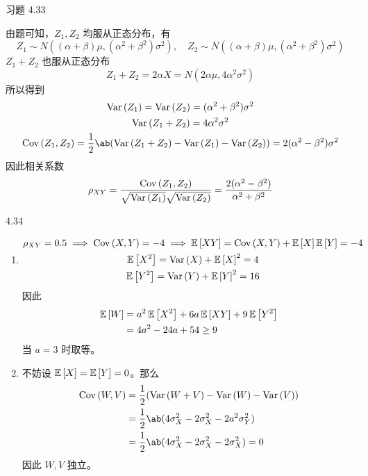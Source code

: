 \begin{problem}
    习题 4.33
    \begin{solution}
        由题可知，$Z_1, Z_2$ 均服从正态分布，有
        $$
        Z_1 \sim N((\alpha + \beta) \mu, (\alpha^2 + \beta^2) \sigma^2),\quad Z_2 \sim N((\alpha + \beta) \mu, (\alpha^2 + \beta^2) \sigma^2)
        $$
        $Z_1 + Z_2$ 也服从正态分布
        $$
        Z_1 + Z_2 = 2 \alpha X = N(2 \alpha \mu, 4 \alpha^2 \sigma^2)
        $$
        所以得到
        $$
        \begin{gathered}
            \variance{Z_1} = \variance{Z_2} = (\alpha^2 + \beta^2) \sigma^2 \\
            \variance{Z_1 + Z_2} = 4 \alpha^2 \sigma^2 \\
            \cov{Z_1}{Z_2} = \frac{1}{2} \ab(\variance{Z_1 + Z_2} - \variance{Z_1} - \variance{Z_2}) = 2 (\alpha^2 - \beta^2) \sigma^2
        \end{gathered}
        $$
        因此相关系数
        $$
        \rho_{X Y} = \frac{\operatorname{Cov}\left(Z_1, Z_2\right)}{\sqrt{\operatorname{Var}\left(Z_1\right)} \sqrt{\operatorname{Var}\left(Z_2\right)}} = \frac{2 (\alpha^2 - \beta^2)}{\alpha^2 + \beta^2}
        $$
    \end{solution}
\end{problem}

\begin{problem}
    4.34
    \begin{solution}
        \begin{enumerate}
            \item[\textbf{1)}]
            $$
            \begin{gathered}
                \rho_{X Y} = 0.5 \implies \operatorname{Cov}\left(X, Y\right) = -4 \implies \operatorname{\mathbb{E}}\left[X Y\right] = \operatorname{Cov}\left(X, Y\right) + \operatorname{\mathbb{E}}\left[X\right] \operatorname{\mathbb{E}}\left[Y\right] = -4 \\
                \operatorname{\mathbb{E}}\left[X^2\right] = \operatorname{Var}\left(X\right) + \operatorname{\mathbb{E}}\left[X\right]^2 = 4 \\
                \operatorname{\mathbb{E}}\left[Y^2\right] = \operatorname{Var}\left(Y\right) + \operatorname{\mathbb{E}}\left[Y\right]^2 = 16
            \end{gathered}
            $$
            因此
            $$
            \begin{aligned}
                \operatorname{\mathbb{E}}\left[W\right] & = a^2 \operatorname{\mathbb{E}}\left[X^2\right] + 6 a \operatorname{\mathbb{E}}\left[X Y\right] + 9 \operatorname{\mathbb{E}}\left[Y^2\right] \\
                & = 4 a^2 - 24 a + 54 \ge 9
            \end{aligned}
            $$
            当 $a = 3$ 时取等。

            \item[\textbf{2)}] 不妨设 $\operatorname{\mathbb{E}}\left[X\right] = \operatorname{\mathbb{E}}\left[Y\right] = 0$。那么
            $$
            \begin{aligned}
                \cov{W}{V} & = \frac{1}{2} (\variance{W + V} - \variance{W} - \variance{V}) \\
                & = \frac{1}{2} \ab(4 \sigma_X^2 - 2 \sigma_X^2 - 2 a^2 \sigma_Y^2) \\
                & = \frac{1}{2} \ab(4 \sigma_X^2 - 2 \sigma_X^2 - 2 \sigma_X^2) = 0
            \end{aligned}
            $$
            因此 $W, V$ 独立。
        \end{enumerate}
    \end{solution}
\end{problem}

